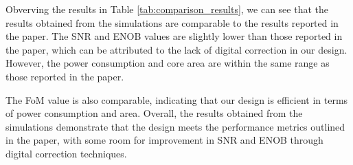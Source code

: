 Obverving the results in Table \ref{tab:comparison_results}, we can see that the results obtained from the simulations are comparable to the results reported in the paper. The SNR and ENOB values are slightly lower than those reported in the paper, which can be attributed to the lack of digital correction in our design. However, the power consumption and core area are within the same range as those reported in the paper.

The FoM value is also comparable, indicating that our design is efficient in terms of power consumption and area. Overall, the results obtained from the simulations demonstrate that the design meets the performance metrics outlined in the paper, with some room for improvement in SNR and ENOB through digital correction techniques.